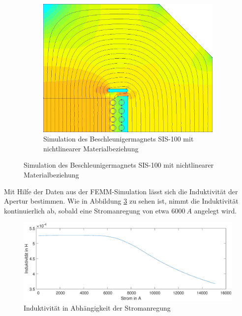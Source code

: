\begin{figure}[h!]
\begin{subfigure}[h]{.60\textwidth}
		\includegraphics[width=\textwidth]{data/Nichtlinear}
		\caption{Simulation des Beschleunigermagnets SIS-100 mit nichtlinearer Materialbeziehung}
		\label{fig:NichtLinear}
	\end{subfigure}	
\end{figure}

Mit Hilfe der Daten aus der FEMM-Simulation lässt sich die Induktivität der Apertur bestimmen. Wie in Abbildung \ref{fig:plot} zu sehen ist, nimmt die Induktivität kontinuierlich ab, sobald eine Stromanregung von etwa $\SI{6000}{A}$ angelegt wird. 


\begin{figure}[h]
	\centering
	\includegraphics[width=\textwidth]{data/Ag8_3dplot}
	\caption{Induktivität in Abhängigkeit der Stromanregung}
	\label{fig:plot}
\end{figure}